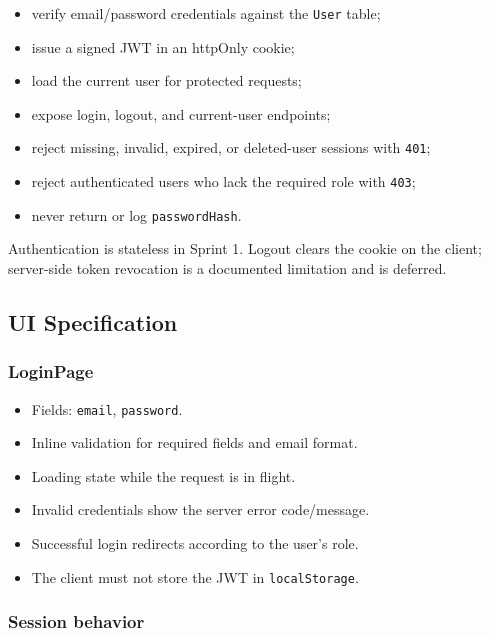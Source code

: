 \documentclass[11pt,a4paper]{article}
\begin{document}
\begin{itemize}[leftmargin=*,itemsep=2pt,topsep=2pt]
  \item verify email/password credentials against the \texttt{User} table;
  \item issue a signed JWT in an httpOnly cookie;
  \item load the current user for protected requests;
  \item expose login, logout, and current-user endpoints;
  \item reject missing, invalid, expired, or deleted-user sessions with \texttt{401};
  \item reject authenticated users who lack the required role with \texttt{403};
  \item never return or log \texttt{passwordHash}.
\end{itemize}
Authentication is stateless in Sprint 1. Logout clears the cookie on the client;\\
server-side token revocation is a documented limitation and is deferred.\\


\subsection{UI Specification}

\subsubsection{LoginPage}

\begin{itemize}[leftmargin=*,itemsep=2pt,topsep=2pt]
  \item Fields: \texttt{email}, \texttt{password}.
  \item Inline validation for required fields and email format.
  \item Loading state while the request is in flight.
  \item Invalid credentials show the server error code/message.
  \item Successful login redirects according to the user's role.
  \item The client must not store the JWT in \texttt{localStorage}.
\end{itemize}
\subsubsection{Session behavior}
\end{document}
